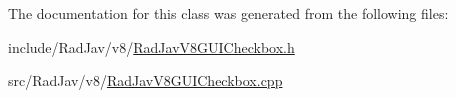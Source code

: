 The documentation for this class was generated from the following files\+:\begin{DoxyCompactItemize}
\item 
include/\+Rad\+Jav/v8/\mbox{\hyperlink{_rad_jav_v8_g_u_i_checkbox_8h}{Rad\+Jav\+V8\+G\+U\+I\+Checkbox.\+h}}\item 
src/\+Rad\+Jav/v8/\mbox{\hyperlink{_rad_jav_v8_g_u_i_checkbox_8cpp}{Rad\+Jav\+V8\+G\+U\+I\+Checkbox.\+cpp}}\end{DoxyCompactItemize}
